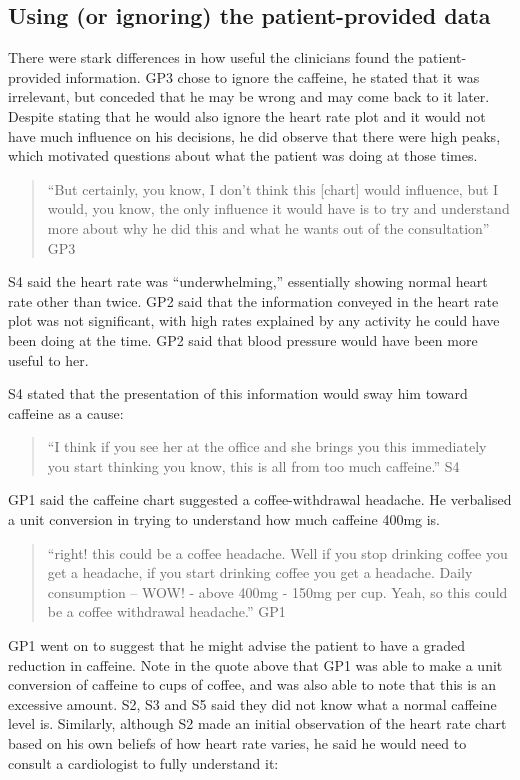 \documentclass{sigchi}
\begin{document}
\subsection{Using (or ignoring) the patient-provided data}

There were stark differences in how useful the clinicians found the patient-provided information. GP3 chose to ignore the caffeine, he stated that it was irrelevant, but conceded that he may be wrong and may come back to it later. Despite stating that he would also ignore the heart rate plot and it would not have much influence on his decisions, he did observe that there were high peaks, which motivated questions about what the patient was doing at those times. 

\begin{quote}
    ``But certainly, you know, I don't think this [chart] would influence, but I would, you know, the only influence it would have is to try and understand more about why he did this and what he wants out of the consultation'' GP3
\end{quote}

S4 said the heart rate was ``underwhelming,'' essentially showing normal heart rate other than twice. GP2 said that the information conveyed in the heart rate plot was not significant, with high rates explained by any activity he could have been doing at the time. GP2 said that blood pressure would have been more useful to her.

S4 stated that the presentation of this information would sway him toward caffeine as a cause:

\begin{quote}
    ``I think if you see her at the office and she brings you this immediately you start thinking you know, this is all from too much caffeine.'' S4
\end{quote}

GP1 said the caffeine chart suggested a coffee-withdrawal headache. He verbalised a unit conversion in trying to understand how much caffeine 400mg is.

\begin{quote}
    ``right! this could be a coffee headache. Well if you stop drinking coffee you get a headache, if you start drinking coffee you get a headache. Daily consumption -- WOW! - above 400mg - 150mg per cup. Yeah, so this could be a coffee withdrawal headache.'' GP1
\end{quote}

GP1 went on to suggest that he might advise the patient to have a graded reduction in caffeine. Note in the quote above that GP1 was able to make a unit conversion of caffeine to cups of coffee, and was also able to note that this is an excessive amount. S2, S3 and S5 said they did not know what a normal caffeine level is. Similarly, although S2 made an initial observation of the heart rate chart based on his own beliefs of how heart rate varies, he said he would need to consult a cardiologist to fully understand it:
\end{document}
